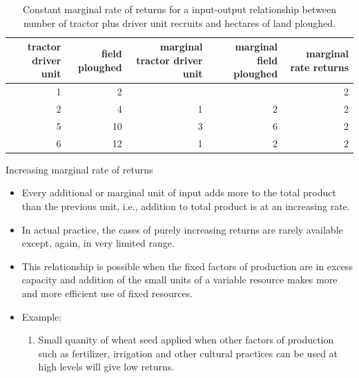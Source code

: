 \documentclass[12pt,ignorenonframetext,aspectratio=169]{beamer}
\providecommand{\tightlist}{%
  \setlength{\itemsep}{0pt}\setlength{\parskip}{0pt}}
\begin{document}
\begin{frame}{}
\protect\hypertarget{section-2}{}
\begin{table}

\caption{\label{tab:tractor-driver-unit-cmr-tab}Constant marginal rate of returns for a input-output relationship between number of tractor plus driver unit recruits and hectares of land ploughed.}
\centering
\fontsize{6}{8}\selectfont
\begin{tabular}[t]{rrrrr}
\toprule
tractor driver unit & field ploughed & marginal tractor driver unit & marginal field ploughed & marginal rate returns\\
\midrule
1 & 2 &  &  & 2\\
2 & 4 & 1 & 2 & 2\\
5 & 10 & 3 & 6 & 2\\
6 & 12 & 1 & 2 & 2\\
\bottomrule
\end{tabular}
\end{table}
\end{frame}

\begin{frame}{Increasing marginal rate of returns}
\protect\hypertarget{increasing-marginal-rate-of-returns}{}
\begin{itemize}
\tightlist
\item
  Every additional or marginal unit of input adds more to the total
  product than the previous unit, i.e., addition to total product is at
  an increasing rate.
\item
  In actual practice, the cases of purely increasing returns are rarely
  available except, again, in very limited range.
\item
  This relationship is possible when the fixed factors of production are
  in excess capacity and addition of the small units of a variable
  resource makes more and more efficient use of fixed resources.
\item
  Example:

  \begin{enumerate}
  \tightlist
  \item
    Small quanity of wheat seed applied when other factors of production
    such as fertilizer, irrigation and other cultural practices can be
    used at high levels will give low returns.
  \end{enumerate}
\end{itemize}
\end{frame}
\end{document}
